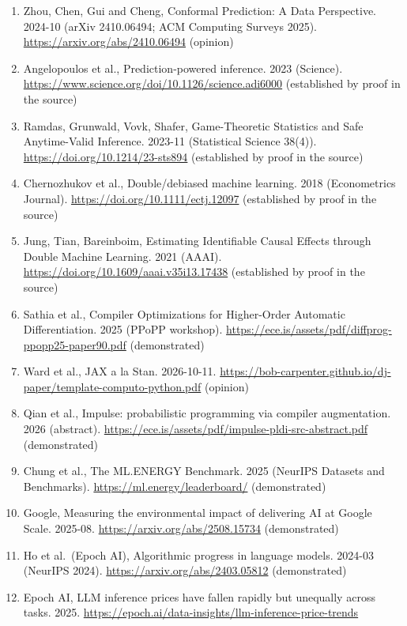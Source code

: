 \documentclass[10pt,letterpaper]{article}
\begin{document}
\begin{enumerate}
  \url{https://arxiv.org/abs/2411.11824} (established by proof in the
  source)
\item
  Zhou, Chen, Gui and Cheng, Conformal Prediction: A Data Perspective.
  2024-10 (arXiv 2410.06494; ACM Computing Surveys 2025).
  \url{https://arxiv.org/abs/2410.06494} (opinion)
\item
  Angelopoulos et al., Prediction-powered inference. 2023 (Science).
  \url{https://www.science.org/doi/10.1126/science.adi6000} (established
  by proof in the source)
\item
  Ramdas, Grunwald, Vovk, Shafer, Game-Theoretic Statistics and Safe
  Anytime-Valid Inference. 2023-11 (Statistical Science 38(4)).
  \url{https://doi.org/10.1214/23-sts894} (established by proof in the
  source)
\item
  Chernozhukov et al., Double/debiased machine learning. 2018
  (Econometrics Journal). \url{https://doi.org/10.1111/ectj.12097}
  (established by proof in the source)
\item
  Jung, Tian, Bareinboim, Estimating Identifiable Causal Effects through
  Double Machine Learning. 2021 (AAAI).
  \url{https://doi.org/10.1609/aaai.v35i13.17438} (established by proof
  in the source)
\item
  Sathia et al., Compiler Optimizations for Higher-Order Automatic
  Differentiation. 2025 (PPoPP workshop).
  \url{https://ece.is/assets/pdf/diffprog-ppopp25-paper90.pdf}
  (demonstrated)
\item
  Ward et al., JAX a la Stan. 2026-10-11.
  \url{https://bob-carpenter.github.io/dj-paper/template-computo-python.pdf}
  (opinion)
\item
  Qian et al., Impulse: probabilistic programming via compiler
  augmentation. 2026 (abstract).
  \url{https://ece.is/assets/pdf/impulse-pldi-src-abstract.pdf}
  (demonstrated)
\item
  Chung et al., The ML.ENERGY Benchmark. 2025 (NeurIPS Datasets and
  Benchmarks). \url{https://ml.energy/leaderboard/} (demonstrated)
\item
  Google, Measuring the environmental impact of delivering AI at Google
  Scale. 2025-08. \url{https://arxiv.org/abs/2508.15734} (demonstrated)
\item
  Ho et al.~(Epoch AI), Algorithmic progress in language models. 2024-03
  (NeurIPS 2024). \url{https://arxiv.org/abs/2403.05812} (demonstrated)
\item
  Epoch AI, LLM inference prices have fallen rapidly but unequally
  across tasks. 2025.
  \url{https://epoch.ai/data-insights/llm-inference-price-trends}

\end{enumerate}
\end{document}
